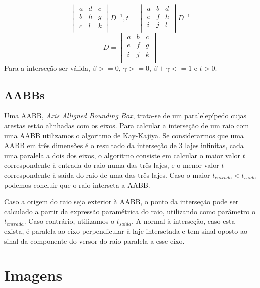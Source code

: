 \documentclass{article}
\begin{document}
\begin{multicols}{2}
$$\begin{vmatrix}
            a & d & c \\
            b & h & g \\
            c & l & k \\
        \end{vmatrix}
        D^{-1},
        t =
        \begin{vmatrix}
            a & b & d \\
            e & f & h \\
            i & j & l \\
        \end{vmatrix}
        D^{-1}
    $$
    $$    
        D =
        \begin{vmatrix}
            a & b & c \\
            e & f & g \\
            i & j & k \\
        \end{vmatrix}
    $$
    Para a interseção ser válida, $\beta >= 0$, $\gamma >= 0$, $\beta + \gamma <= 1$ e $t > 0$.

    \subsection{AABBs}

    Uma AABB, \textit{Axis Alligned Bounding Box}, trata-se de um paralelepípedo cujas arestas estão
    alinhadas com os eixos. Para calcular a interseção de um raio com uma AABB utilizamos o algoritmo de
    Kay-Kajiya. Se considerarmos que uma AABB em três dimensões é o resultado da interseção de 3 lajes
    infinitas, cada uma paralela a dois dos eixos, o algoritmo consiste em calcular o maior valor $t$
    correspondente à entrada do raio numa das três lajes, e o menor valor $t$ correspondente à saída do
    raio de uma das três lajes. Caso o maior $t_{entrada} < t_{saida}$ podemos concluir que o raio
    interseta a AABB.
    
    Caso a origem do raio seja exterior à AABB, o ponto da interseção pode ser calculado a partir da
    expressão paramétrica do raio, utilizando como parâmetro o $t_{entrada}$. Caso contrário,
    utilizamos o $t_{saida}$. A normal à interseção, caso esta exista, é paralela ao eixo perpendicular
    à laje intersetada e tem sinal oposto ao sinal da componente do versor do raio paralela a esse
    eixo.

    \end{multicols}

    \newpage
    \section{Imagens}
\end{document}

